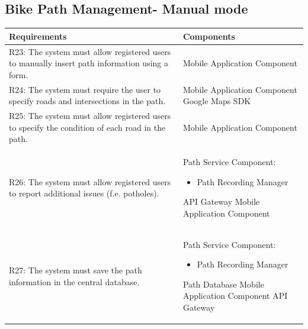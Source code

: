 \subsection{Bike Path Management- Manual mode}
\begin{table}[ht]
\begin{tabular}{|p{9cm}|p{6cm}|}
\hline
\textbf{Requirements}      & \multicolumn{1}{l|}{\textbf{Components}}\\ \hline
R23: The system must allow registered users to manually insert path information using a form.
&
Mobile Application Component
\\ \hline
R24: The system must require the user to specify roads and intersections in the path.  
&
Mobile Application Component
\newline
Google Maps SDK
\\ \hline
R25: The system must allow registered users to specify the condition of each road in the path. 
&
Mobile Application Component
\\ \hline
R26: The system must allow registered users to report additional issues (f.e. potholes). 
&
Path Service Component:
\begin{itemize}
    \item Path Recording Manager
\end{itemize}
API Gateway
\newline
Mobile Application Component
\\ \hline
R27: The system must save the path information in the central database. 
&
Path Service Component:
\begin{itemize}
    \item Path Recording Manager
\end{itemize}
Path Database
\newline
Mobile Application Component 
\newline
API Gateway
\\ \hline
\end{tabular}
\end{table}
\newpage

